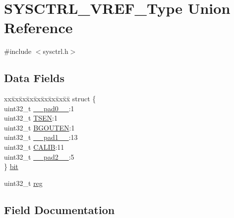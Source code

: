 \hypertarget{union_s_y_s_c_t_r_l___v_r_e_f___type}{}\section{S\+Y\+S\+C\+T\+R\+L\+\_\+\+V\+R\+E\+F\+\_\+\+Type Union Reference}
\label{union_s_y_s_c_t_r_l___v_r_e_f___type}


{\ttfamily \#include $<$sysctrl.\+h$>$}

\subsection*{Data Fields}
\begin{DoxyCompactItemize}
\item 
\begin{tabbing}
xx\=xx\=xx\=xx\=xx\=xx\=xx\=xx\=xx\=\kill
struct \{\\
\>uint32\_t \mbox{\hyperlink{union_s_y_s_c_t_r_l___v_r_e_f___type_a3e57c2ef1c3ffb36722f000cc1156824}{\_\_pad0\_\_}}:1\\
\>uint32\_t \mbox{\hyperlink{union_s_y_s_c_t_r_l___v_r_e_f___type_ac27e9f721252d5dd4b43ef11c3ec588c}{TSEN}}:1\\
\>uint32\_t \mbox{\hyperlink{union_s_y_s_c_t_r_l___v_r_e_f___type_a265f7aab1175734cfdef0f2b4515b859}{BGOUTEN}}:1\\
\>uint32\_t \mbox{\hyperlink{union_s_y_s_c_t_r_l___v_r_e_f___type_a6712ba6dd1d5b43d2d56ff8ac4e275a7}{\_\_pad1\_\_}}:13\\
\>uint32\_t \mbox{\hyperlink{union_s_y_s_c_t_r_l___v_r_e_f___type_a95f06de3371ee421b89d4be2aae51561}{CALIB}}:11\\
\>uint32\_t \mbox{\hyperlink{union_s_y_s_c_t_r_l___v_r_e_f___type_a9ce12a63de64ef64ae2d59d128251cae}{\_\_pad2\_\_}}:5\\
\} \mbox{\hyperlink{union_s_y_s_c_t_r_l___v_r_e_f___type_a041c02ea65874aecefa437e10e77baa0}{bit}}\\

\end{tabbing}\item 
uint32\+\_\+t \mbox{\hyperlink{union_s_y_s_c_t_r_l___v_r_e_f___type_a6b91636401516a477989a336376d7b40}{reg}}
\end{DoxyCompactItemize}


\subsection{Field Documentation}
\mbox{\label{union_s_y_s_c_t_r_l___v_r_e_f___type_a3e57c2ef1c3ffb36722f000cc1156824}} 
